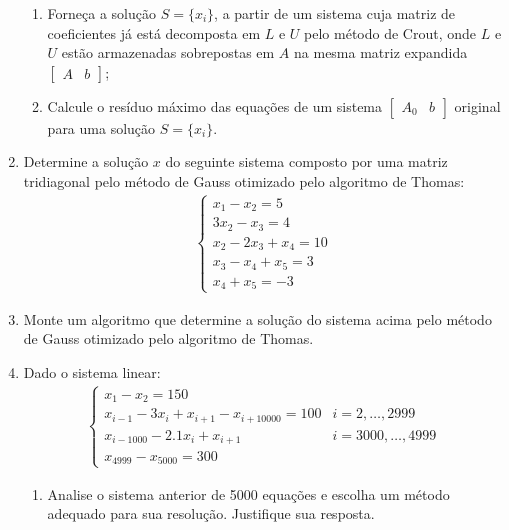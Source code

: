 \documentclass[12pt]{article}
\newenvironment{smallitem}{
    \vspace{-2mm}
    \begin{enumerate}
    \setlength{\parskip}{0pt}
    \setlength{\itemsep}{2pt}
}{
    \vspace{-2mm}
    \end{enumerate}
}
\begin{document}
\begin{enumerate}[label=\textbf{\arabic*})]
\begin{smallitem}
\item Forneça a solução $S = \{x_i\}$, a partir de um sistema cuja matriz de
coeficientes já está decomposta em $L$ e $U$ pelo método de Crout, onde $L$ e
$U$ estão armazenadas sobrepostas em $A$ na mesma matriz expandida
$\begin{bmatrix} A & b \end{bmatrix}$;

\item Calcule o resíduo máximo das equações de um sistema
$\begin{bmatrix} A_0 & b \end{bmatrix}$ original para uma solução $S = \{x_i\}$.

\end{smallitem}

\item Determine a solução $x$ do seguinte sistema composto por uma matriz
tridiagonal pelo método de Gauss otimizado pelo algoritmo de Thomas:
\begin{align*}
\begin{cases}
x_1 - x_2 = 5 \\
3x_2 - x_3 = 4 \\
x_2 - 2x_3 + x_4 = 10 \\
x_3 - x_4 + x_5 = 3 \\
x_4 + x_5 = -3
\end{cases}
\end{align*}

\item Monte um algoritmo que determine a solução do sistema acima pelo método de
Gauss otimizado pelo algoritmo de Thomas.

\item Dado o sistema linear:
\begin{align*}
\begin{cases}
x_1 - x_2 = 150 \\
x_{i - 1} - 3x_i + x_{i + 1} - x_{i + 10000} = 100 & i = 2, \dots, 2999 \\
x_{i - 1000} - 2.1x_i + x_{i + 1} & i = 3000, \dots, 4999 \\
x_{4999} - x_{5000} = 300
\end{cases}
\end{align*}

\begin{smallitem}

\item Analise o sistema anterior de 5000 equações e escolha um método adequado
para sua resolução. Justifique sua resposta.


\end{smallitem}
\end{enumerate}
\end{document}
